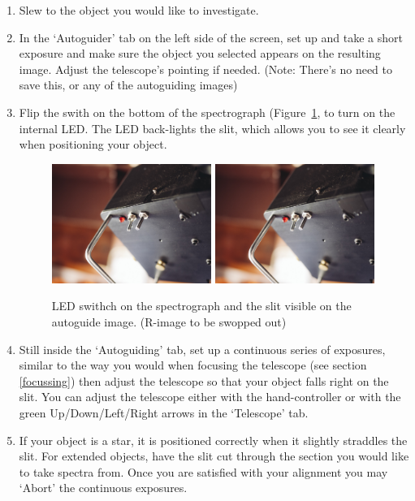 \documentclass[12pt,twoside,a4paper]{report}
\begin{document}
\begin{enumerate}
 \item Slew to the object you would like to investigate.
 \item In the `Autoguider' tab on the left side of the screen, set up and take a short exposure and make sure the object you selected appears on the resulting image. Adjust the telescope's pointing if needed. (Note: There's no need to save this, or any of the autoguiding images)
 \item Flip the swith on the bottom of the spectrograph (Figure~\ref{fig:internal_LED}, to turn on the internal LED. The LED back-lights the slit, which allows you to see it clearly when positioning your object.

 \begin{figure}[ht]
  \centering
    \includegraphics[width=0.49\textwidth]{documentation_images/internal_LED.jpg}
    \includegraphics[width=0.49\textwidth]{documentation_images/internal_LED.jpg}
    \caption{\label{fig:internal_LED}LED swithch on the spectrograph and the slit visible on the autoguide image. (R-image to be swopped out)}
 \end{figure}

 \item Still inside the `Autoguiding' tab, set up a continuous series of exposures, similar to the way you would when focusing the telescope (see section \ref{focussing}) then adjust the telescope so that your object falls right on the slit. You can adjust the telescope either with the hand-controller or with the green Up/Down/Left/Right arrows in the `Telescope' tab.

 \item If your object is a star, it is positioned correctly when it slightly straddles the slit. For extended objects, have the slit cut through the section you would like to take spectra from. Once you are satisfied with your alignment you may `Abort' the continuous exposures.\\

\end{enumerate}
\end{document}
